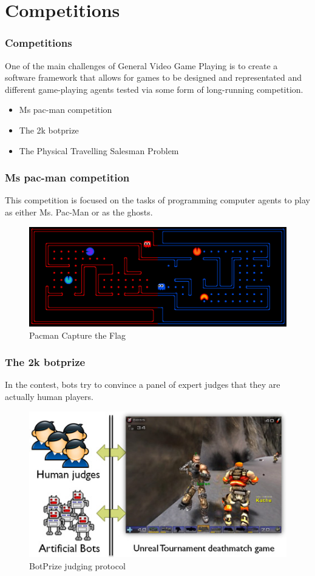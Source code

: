 \documentclass{beamer}
\begin{document}
\section{Competitions}
\begin{frame}
  \frametitle{Competitions}
  One of the main challenges of General Video Game Playing is to create a software framework that allows for games to be designed and representated and different game-playing agents tested via some form of long-running competition. 
  \begin{itemize}
    \item Ms pac-man competition
    \item The 2k botprize
    \item The Physical Travelling Salesman Problem
  \end{itemize}
  
\end{frame}

\begin{frame}
  \frametitle{Ms pac-man competition\cite{2}}
  This competition is focused on the tasks of programming computer agents to play as either Ms. Pac-Man or as the ghosts.
  \begin{figure}
    \includegraphics[width=1\linewidth]{figures/pacman}
    \caption{Pacman Capture the Flag}
  \end{figure}

\end{frame}

\begin{frame}
  \frametitle{The 2k botprize\cite{3}}
  In the contest, bots try to convince a panel of expert judges that they are actually human players.
  \begin{figure}
    \includegraphics[width=1\linewidth]{figures/botprize}
    \caption{BotPrize judging protocol}
  \end{figure}

\end{frame}
\end{document}
